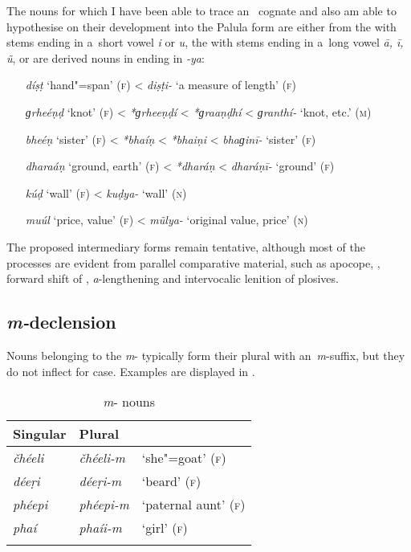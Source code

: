 The nouns for which I have been able to trace an~ cognate and also am able to hypothesise on their development into the Palula form are either from the   with stems ending in a~short vowel \textit{i} or \textit{u}, the  with stems ending in a~long vowel \textit{ā, ī, ũ}, or are derived nouns in  ending in \textit{-ya}: 

\begin{itemize}[itemsep=0pt, leftmargin=]
\item[\textit{díṣṭ} `hand"=span' (\textsc{f})] {\textless} \textit{diṣṭi-} `a measure of length' (\textsc{f})
\item[\textit{ɡrheéṇḍ} `knot' (\textsc{f})] {\textless} \textit{*ɡrheeṇḍí} {\textless} \textit{*ɡraaṇḍhí} {\textless} \textit{ɡranthí-} `knot, etc.' (\textsc{m})
\item[\textit{bheéṇ} `sister' (\textsc{f})] {\textless} \textit{*bhaíṇ} {\textless} \textit{*bhaiṇi} {\textless} \textit{bhaɡinī-} `sister' (\textsc{f})
\item[\textit{dharaáṇ} `ground, earth' (\textsc{f})] {\textless} \textit{*dharáṇ} {\textless} \textit{dharáṇī-} `ground' (\textsc{f})
\item[\textit{kúḍ} `wall' (\textsc{f})] {\textless} \textit{kuḍya-} `wall' (\textsc{n})
\item[\textit{muúl} `price, value' (\textsc{f})] {\textless} \textit{mũlya-} `original value, price' (\textsc{n})
\end{itemize}

The proposed intermediary forms remain tentative, although most of the processes are evident from parallel comparative material, such as apocope, , forward shift of , \textit{a}-lengthening and intervocalic lenition of plosives.

\subsection{\textit{m-}declension}
\label{subsec:4-6-3}

Nouns belonging to the \textit{m}- typically form their plural with an~\textit{m}-suffix, but they do not inflect for  case. Examples are displayed in . 


\begin{table}[ht]
\caption{\textit{m}- nouns}
\begin{tabularx}{.75\textwidth}{ Q Q l }
\lsptoprule
Singular &
Plural &
\\\hline
\textit{čhéeli } &
\textit{čhéeli-m} &
`she"=goat' (\textsc{f})\\
\textit{déeṛi} &
\textit{déeṛi-m} &
`beard' (\textsc{f})\\
\textit{phéepi} &
\textit{phéepi-m} &
`paternal aunt' (\textsc{f})\\
\textit{phaí} &
\textit{phaíi-m} &
`girl' (\textsc{f})\\\lspbottomrule
\end{tabularx}
\label{tab:4-16}
\end{table}

